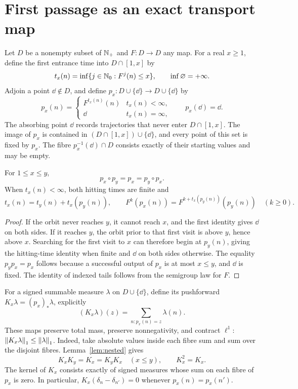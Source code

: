 \section{First passage as an exact transport map}\label{sec:transport}

Let $D$ be a nonempty subset of $\mathbb N_+$ and $F:D\to D$ any map.
For a real $x\geq1$, define the first entrance time into $D\cap[1,x]$ by
\[
 t_x(n)=\inf\{j\in\mathbb N_0:F^j(n)\leq x\},\qquad\inf\varnothing=+\infty.
\]
Adjoin a point $\dd\notin D$, and define $p_x:D\cup\{\dd\}\to
D\cup\{\dd\}$ by
\[
 p_x(n)=\begin{cases}F^{t_x(n)}(n)&t_x(n)<\infty,\\
 \dd&t_x(n)=\infty,\end{cases}\qquad p_x(\dd)=\dd.
\]
The absorbing point $\dd$ records trajectories that never enter
$D\cap[1,x]$.  The image of $p_x$ is contained in
$(D\cap[1,x])\cup\{\dd\}$, and every point of this set is fixed by $p_x$.
The fibre $p_x^{-1}(\dd)\cap D$ consists exactly of their starting values
and may be empty.

\begin{lemma}\label{lem:nested}
For $1\leq x\leq y$,
\begin{equation}\label{eq:nested}
 p_x\circ p_y=p_x=p_y\circ p_x.
\end{equation}
When $t_x(n)<\infty$, both hitting times are finite and
\[
 t_x(n)=t_y(n)+t_x(p_y(n)),\qquad
 F^{k}(p_x(n))=F^{k+t_x(p_y(n))}(p_y(n))\quad(k\geq0).
\]
\end{lemma}
\begin{proof}
If the orbit never reaches $y$, it cannot reach $x$, and the first
identity gives $\dd$ on both sides.  If it reaches $y$, the orbit prior
to that first visit is above $y$, hence above $x$.  Searching for the
first visit to $x$ can therefore begin at $p_y(n)$, giving the hitting-time
identity when finite and $\dd$ on both sides otherwise.  The equality
$p_y p_x=p_x$ follows because a successful output of $p_x$ is at most
$x\leq y$, and $\dd$ is fixed.  The identity of indexed tails follows
from the semigroup law for $F$.
\end{proof}

For a signed summable measure $\lambda$ on $D\cup\{\dd\}$, define its
pushforward $K_x\lambda=(p_x)_*\lambda$, explicitly
\[
 (K_x\lambda)(z)=\sum_{n:p_x(n)=z}\lambda(n).
\]
These maps preserve total mass, preserve nonnegativity, and contract
$\ell^1$: $\left\|K_x\lambda\right\|_1\leq\left\|\lambda\right\|_1$.  Indeed, take
absolute values inside each fibre sum and sum over the disjoint fibres.
Lemma~\ref{lem:nested} gives
\begin{equation}\label{eq:kernel}
 K_xK_y=K_x=K_yK_x\quad(x\leq y),\qquad K_x^2=K_x.
\end{equation}
The kernel of $K_x$ consists exactly of signed measures whose sum on
each fibre of $p_x$ is zero.  In particular,
$K_x(\delta_n-\delta_{n'})=0$ whenever $p_x(n)=p_x(n')$.

